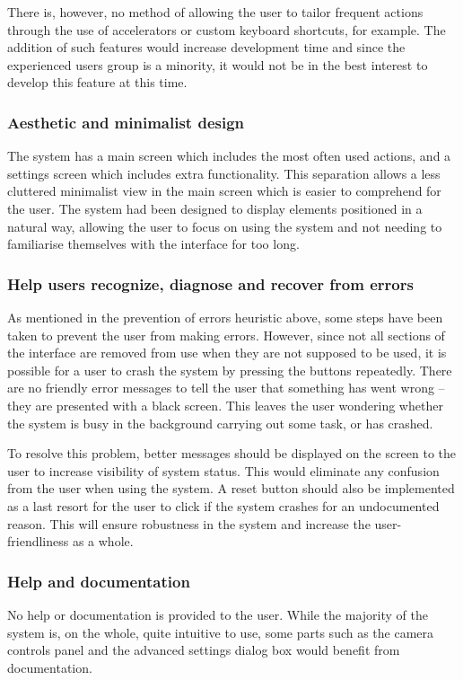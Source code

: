 \documentclass{article}
\begin{document}
There is, however, no method of allowing the user to tailor frequent actions through the use of accelerators or custom keyboard shortcuts, for example. The addition of such features would increase development time and since the experienced users group is a minority, it would not be in the best interest to develop this feature at this time.

\subsubsection{Aesthetic and minimalist design}
The system has a main screen which includes the most often used actions, and a settings screen which includes extra functionality. This separation allows a less cluttered minimalist view in the main screen which is easier to comprehend for the user. The system had been designed to display elements positioned in a natural way, allowing the user to focus on using the system and not needing to familiarise themselves with the interface for too long.   

\subsubsection{Help users recognize, diagnose and recover from errors}
As mentioned in the prevention of errors heuristic above, some steps have been taken to prevent the user from making errors. However, since not all sections of the interface are removed from use when they are not supposed to be used, it is possible for a user to crash the system by pressing the buttons repeatedly. There are no friendly error messages to tell the user that something has went wrong -- they are presented with a black screen. This leaves the user wondering whether the system is busy in the background carrying out some task, or has crashed.

To resolve this problem, better messages should be displayed on the screen to the user to increase visibility of system status. This would eliminate any confusion from the user when using the system. A reset button should also be implemented as a last resort for the user to click if the system crashes for an undocumented reason. This will ensure robustness in the system and increase the user-friendliness as a whole.

\subsubsection{Help and documentation}
No help or documentation is provided to the user. While the majority of the system is, on the whole, quite intuitive to use, some parts such as the camera controls panel and the advanced settings dialog box would benefit from documentation.
\end{document}
